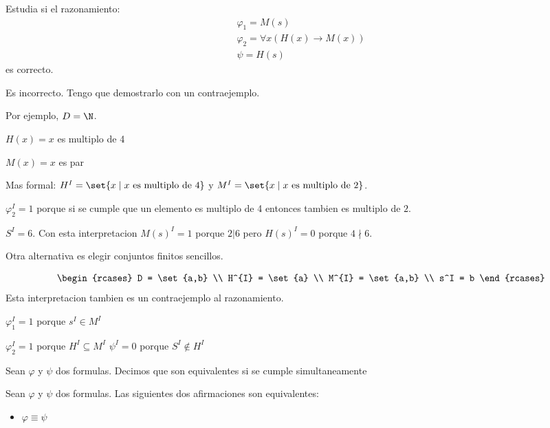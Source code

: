 \begin{example}
	Estudia si el razonamiento:
	\[
		\begin{array}{l}
			\varphi_1=  M(s)                             \\
			\varphi_2= \forall x (H(x) \rightarrow M(x)) \\ \hline
			\psi = H(s)
		\end{array}
	\]
	es correcto.

	Es incorrecto. Tengo que demostrarlo con un contraejemplo.

	Por ejemplo, \(D = \N \).

	\(H(x) = x \) es multiplo de 4

	\(M(x) = x \) es par

	Mas formal: \(H^{I} = \set{x \mid x \text{ es multiplo de 4} } \) y \(M^{I} = \set{x \mid x \text{ es multiplo de } 2 } \).

	\(\varphi^{I}_2 = 1 \) porque si se cumple que un elemento es multiplo de 4 entonces tambien es multiplo de \(2 \).

	\(S^{I} = 6 \). Con esta interpretacion \(M(s)^{I} = 1 \) porque \(2|6 \) pero \(H(s)^{I} = 0 \) porque \(4 \nmid 6\).

	Otra alternativa es elegir conjuntos finitos sencillos.

	\[
		\begin{rcases}
			D = \set{a,b}     \\
			H^{I} = \set{a}   \\
			M^{I} = \set{a,b} \\
			s^I = b
		\end{rcases}
	\]
	Esta interpretacion tambien es un contraejemplo al razonamiento.

	\(\varphi^{I}_1 = 1 \) porque \(s^I \in M^{I } \)

	\(\varphi^{I}_2 = 1 \) porque \(H^{I} \subseteq M^{I }  \)
	\(\psi^{I} = 0  \) porque \(S^{I} \not\in H^{I }  \)
\end{example}

\begin{definition}
	Sean \(\varphi\) y \(\psi \) dos formulas. Decimos que son equivalentes si se cumple simultaneamente

\end{definition}

\begin{proposition}
	Sean \(\varphi\) y \(\psi \) dos formulas. Las siguientes dos afirmaciones son equivalentes:
	\begin{itemize}
		\item \(\varphi \equiv \psi \)
	\end{itemize}
\end{proposition}

